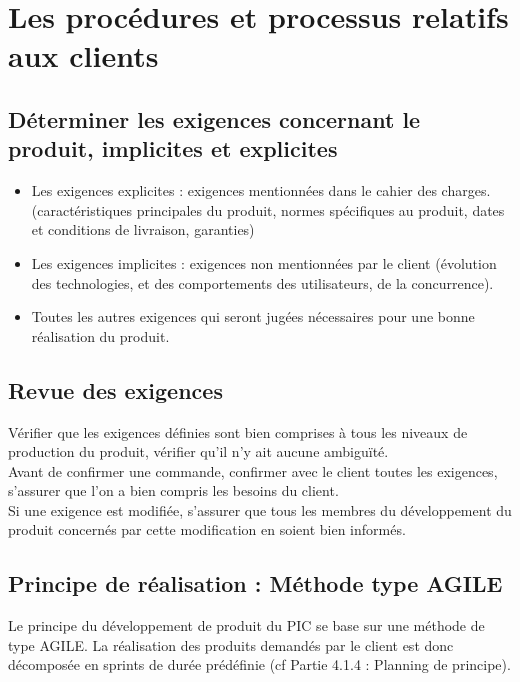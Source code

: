 \section{Les procédures et processus relatifs aux clients}
\label{client}

\subsection{Déterminer les exigences concernant le produit, implicites et explicites}

\begin{itemize}
\item Les exigences explicites : exigences mentionnées dans le cahier des charges. (caractéristiques principales du produit, normes spécifiques au produit, dates et conditions de livraison, garanties)
\item Les exigences implicites : exigences non mentionnées par le client (évolution des technologies, et des comportements des utilisateurs, de la concurrence).
\item Toutes les autres exigences qui seront jugées nécessaires pour une bonne réalisation du produit.
\end{itemize}

\subsection{Revue des exigences}

Vérifier que les exigences définies sont bien comprises à tous les niveaux de production du produit, vérifier qu’il n’y ait aucune ambiguïté. \\
Avant de confirmer une commande, confirmer avec le client toutes les exigences, s’assurer que l’on a bien compris les besoins du client.\\
Si une exigence est modifiée, s’assurer que tous les membres du développement du produit concernés par cette modification en soient bien informés.\\

\subsection{Principe de réalisation : Méthode type AGILE}
Le principe du développement de produit du PIC \nomPIC{} se base sur une méthode de type
AGILE. La réalisation des produits demandés par le client est donc décomposée en sprints de durée prédéfinie (cf Partie 4.1.4 : Planning de principe).


